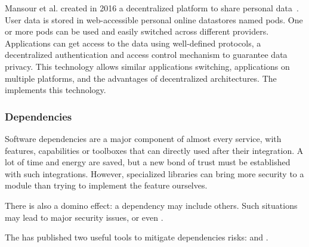 Mansour et al. created in 2016 a decentralized platform to share personal data~\cite{mansour_demonstration_2016}. User data is stored in web-accessible personal online datastores named pods. One or more pods can be used and easily switched across different providers. Applications can get access to the data using well-defined protocols, a decentralized authentication and access control mechanism to guarantee data privacy. This technology allows similar applications switching, applications on multiple platforms, and the advantages of decentralized architectures. The  implements this technology. %

\subsubsection{Dependencies}
\label{subsubsec:state_review_results_dependencies}

Software dependencies are a major component of almost every service, with features, capabilities or toolboxes that can directly used after their integration. A lot of time and energy are saved, but a new bond of trust must be established with such integrations. However, specialized libraries can bring more security to a module than trying to implement the feature ourselves.

There is also a domino effect: a dependency may include others. Such situations may lead to major security issues, or even .

The  has published two useful tools to mitigate dependencies risks:  and .

